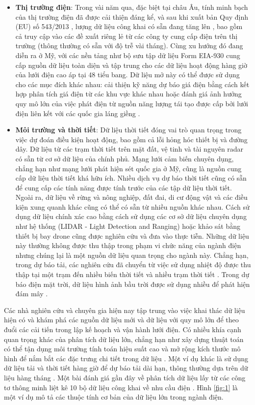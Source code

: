 \documentclass[utf8]{frontiersSCNS} %
\begin{document}
\begin{itemize}
	\item \textbf{Thị trường điện}: Trong vài năm qua, đặc biệt tại châu Âu, tính minh bạch của thị trường điện đã được cải thiện đáng kể, và sau khi xuất bản Quy định (EU) số 543/2013 \citep{EU2013}, lượng dữ liệu công khai có sẵn đang tăng lên \citep{Hirth2018}, bao gồm cả truy cập vào các đề xuất riêng lẻ từ các công ty cung cấp điện trên thị trường (thông thường có sẵn với độ trễ vài tháng). Cùng xu hướng đó đang diễn ra ở Mỹ, với các nền tảng như bộ sưu tập dữ liệu Form EIA-930 cung cấp nguồn dữ liệu toàn diện và tập trung cho các dữ liệu hoạt động hàng giờ của lưới điện cao áp tại 48 tiểu bang. Dữ liệu mở này có thể được sử dụng cho các mục đích khác nhau: cải thiện kỹ năng dự báo giá điện bằng cách kết hợp phân tích giá điện từ các khu vực khác nhau \citep{Ziel2018} hoặc đánh giá ảnh hưởng quy mô lớn của việc phát điện từ nguồn năng lượng tái tạo được cấp bởi lưới điện liên kết với các quốc gia láng giềng \citep{Zugno2013}.
	
	\item \textbf{Môi trường và thời tiết}: Dữ liệu thời tiết đóng vai trò quan trọng trong việc dự đoán điều kiện hoạt động, bao gồm cả lỗi hỏng hóc thiết bị và đường dây. Dữ liệu từ các trạm thời tiết trên mặt đất, vệ tinh và tài nguyên radar có sẵn từ cơ sở dữ liệu của chính phủ. Mạng lưới cảm biến chuyên dụng, chẳng hạn như mạng lưới phát hiện sét quốc gia ở Mỹ, cũng là nguồn cung cấp dữ liệu thời tiết khá hữu ích. Nhiều dịch vụ dự báo thời tiết cũng có sẵn để cung cấp các tính năng được tính trước của các tập dữ liệu thời tiết. Ngoài ra, dữ liệu về rừng và nông nghiệp, đất đai, di cư động vật và các điều kiện xung quanh khác cũng có thể có sẵn từ nhiều nguồn khác nhau. Cách sử dụng dữ liệu chính xác cao bằng cách sử dụng các cơ sở dữ liệu chuyên dụng như hệ thống (LIDAR - Light Detection and Ranging) hoặc khảo sát bằng thiết bị bay drone cũng được nghiên cứu và đưa vào thực tiễn. Những dữ liệu này thường không được thu thập trong phạm vi chức năng của ngành điện nhưng chúng lại là một nguồn dữ liệu quan trọng cho ngành này. Chẳng hạn, trong dự báo tải, các nghiên cứu đã chuyển từ việc sử dụng nhiệt độ được thu thập tại một trạm đến nhiều biến thời tiết và nhiều trạm thời tiết \citep{Hong2015}. Trong dự báo điện mặt trời, dữ liệu hình ảnh bầu trời được sử dụng nhiều để phát hiện đám mây \citep{Kleissl2013}.
\end{itemize}
Các nhà nghiên cứu và chuyên gia hiện nay tập trung vào việc khai thác dữ liệu hiện có và khám phá các nguồn dữ liệu mới và dữ liệu với quy mô lớn để theo đuổi các cải tiến trong lập kế hoạch và vận hành lưới điện. Có nhiều khía cạnh quan trọng khác của phân tích dữ liệu lớn, chẳng hạn như xây dựng thuật toán có thể tận dụng môi trường tính toán hiệu suất cao và mở rộng kích thước mô hình để nắm bắt các đặc trưng chi tiết trong dữ liệu \citep{Wang2016}. Một ví dụ khác là sử dụng dữ liệu tải và thời tiết hàng giờ để dự báo tải dài hạn, thông thường dựa trên dữ liệu hàng tháng \citep{Hyndman2009,Hong2014}. Một bài đánh giá gần đây về phân tích dữ liệu lấy từ các công tơ thông minh liệt kê 10 bộ dữ liệu công khai về nhu cầu điện \citep{Wang2018}. Hình \ref{fig:1} là một ví dụ mô tả các thuộc tính cơ bản của dữ liệu lớn trong ngành điện.
\end{document}
